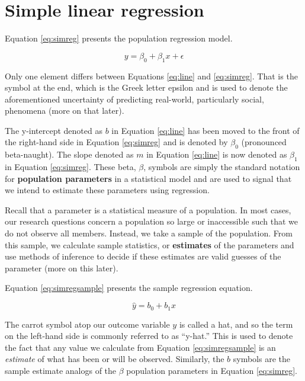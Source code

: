 \documentclass[
]{book}
\begin{document}
\hypertarget{simple-linear-regression}{%
\section{Simple linear regression}\label{simple-linear-regression}}

Equation \eqref{eq:simreg} presents the population regression model.

\begin{equation}
y=\beta_0+\beta_1x+\epsilon
\label{eq:simreg}
\end{equation}

Only one element differs between Equations \eqref{eq:line} and \eqref{eq:simreg}. That is the symbol at the end, which is the Greek letter epsilon and is used to denote the aforementioned uncertainty of predicting real-world, particularly social, phenomena (more on that later).

The y-intercept denoted as \(b\) in Equation \eqref{eq:line} has been moved to the front of the right-hand side in Equation \eqref{eq:simreg} and is denoted by \(\beta_0\) (pronounced beta-naught). The slope denoted as \(m\) in Equation \eqref{eq:line} is now denoted as \(\beta_1\) in Equation \eqref{eq:simreg}. These beta, \(\beta\), symbols are simply the standard notation for \textbf{population parameters} in a statistical model and are used to signal that we intend to estimate these parameters using regression.

Recall that a parameter is a statistical measure of a population. In most cases, our research questions concern a population so large or inaccessible such that we do not observe all members. Instead, we take a sample of the population. From this sample, we calculate sample statistics, or \textbf{estimates} of the parameters and use methods of inference to decide if these estimates are valid guesses of the parameter (more on this later).

Equation \eqref{eq:simregsample} presents the sample regression equation.

\begin{equation}
\hat{y}=b_0+b_1x
\label{eq:simregsample}
\end{equation}

The carrot symbol atop our outcome variable \(y\) is called a hat, and so the term on the left-hand side is commonly referred to as ``y-hat.'' This is used to denote the fact that any value we calculate from Equation \eqref{eq:simregsample} is an \emph{estimate} of what has been or will be observed. Similarly, the \(b\) symbols are the sample estimate analogs of the \(\beta\) population parameters in Equation \eqref{eq:simreg}.
\end{document}
